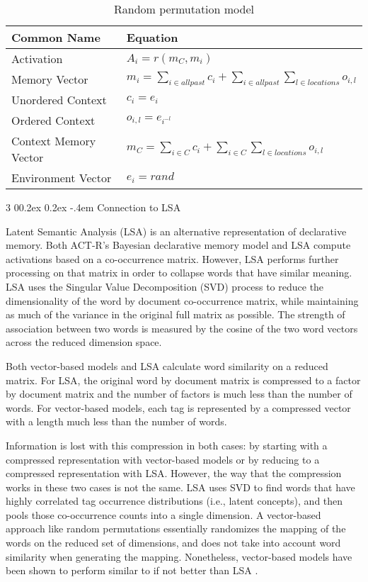 \documentclass[man,floatsintext,donotrepeattitle]{apa6}
\makeatletter
\renewcommand{\subsubsection}{%
  \@startsection
  {subsubsection}%
  {3}%
  {\parindent}%
  {0\baselineskip \@plus 0.2ex \@minus 0.2ex}%
  {-.4em}%
  {\normalfont\normalsize\bfseries\addperi}}
\makeatother
\begin{document}
\begin{table}[!ht]
  \caption{Random permutation model}
  \label{tabRandPermModel}
  {\tabulinesep=1.2mm
    \begin{tabu}{ll}
      \hline
      Common Name &  Equation \\
      \hline
      Activation &		$A_{i} = r(m_{C},m_{i})$ \\
      Memory Vector &		$m_{i} = \sum_{i \in all past} c_{i} + \sum_{i \in all past} \sum_{l \in locations} o_{i,l}$ \\
      Unordered Context &	$c_{i} = e_{i}$ \\
      Ordered Context &		$o_{i,l} = e_{i^{-l}}$ \\
      Context Memory Vector &	$m_{C} = \sum_{i \in C} c_{i} + \sum_{i \in C} \sum_{l \in locations} o_{i,l}$ \\
      Environment Vector & 	$e_{i} = rand$ \\
      \hline
    \end{tabu}
  }
\end{table}

\subsubsection{Connection to LSA}

Latent Semantic Analysis \parencite{Landauer1997} (LSA) is an alternative representation of declarative memory.
Both ACT-R's Bayesian declarative memory model and LSA compute activations based on a co-occurrence matrix.
However, LSA performs further processing on that matrix in order to collapse words that have similar meaning.
LSA uses the Singular Value Decomposition (SVD) process to reduce the dimensionality of the word by document co-occurrence matrix, while maintaining as much of the variance in the original full matrix as possible.
The strength of association between two words is measured by the cosine of the two word vectors across the reduced dimension space.

Both vector-based models and LSA calculate word similarity on a reduced matrix.
For LSA, the original word by document matrix is compressed to a factor by document matrix and the number of factors is much less than the number of words.
For vector-based models, each tag is represented by a compressed vector with a length much less than the number of words.

Information is lost with this compression in both cases: by starting with a compressed representation with vector-based models or by reducing to a compressed representation with LSA.
However, the way that the compression works in these two cases is not the same.
LSA uses SVD to find words that have highly correlated tag occurrence distributions (i.e., latent concepts), and then pools those co-occurrence counts into a single dimension.
A vector-based approach like random permutations essentially randomizes the mapping of the words on the reduced set of dimensions, and does not take into account word similarity when generating the mapping.
Nonetheless, vector-based models have been shown to perform similar to if not better than LSA \parencites{Sahlgren2008,Jones2007}.
\end{document}
